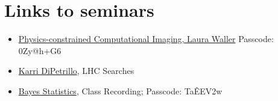 \documentclass[prd,amsmath,aps,floats,amssymb, floatfix,
  superscriptaddress,nofootinbib]{revtex4-1}
\numberwithin{equation}{section}
\newcommand\bei{\begin{itemize}}
\newcommand\eei{\end{itemize}}
\begin{document}
 \section{Links to seminars}
 
 \bei
\item  \href{https://cmu.zoom.us/rec/share/2m9MSmtj6mbf7A_ueusvKnZIFItFV3HPI7QVJ7zlfSCCZGRzBt3iTHKs_fcKLJKx.3rNWZExDpw63YeTg}{Physics-constrained Computational Imaging, Laura Waller} Passcode: 0Zy@h+G6
 \item \href{https://cmu.box.com/s/s16xxmvut99n1fl73yooxq7kwxe6sgfo}{Karri DiPetrillo}, LHC Searches
\item \href{https://cmu.zoom.us/rec/share/tHqLS0TsN0H399MCClI3fv2_dWaraXiiAAA5R3grrEWrA-4OZjclNI4GP_njf_TW.mPFln3zm5t0xyHP7}{Bayes Statistics}, Class Recording;  Passcode: Ta\^EEV2w 
\eei
\end{document}
